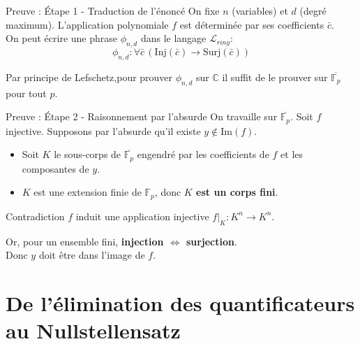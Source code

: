 \documentclass{beamer}
\begin{document}
\begin{frame}{Preuve : Étape 1 - Traduction de l'énoncé}
    On fixe $n$ (variables) et $d$ (degré maximum). L'application polynomiale
    $f$ est déterminée par ses coefficients $\bar{c}$. \\
    \pause
    On peut écrire une phrase $\phi_{n,d}$ dans le langage $\mathcal{L}_{ring}$:
    \[ \phi_{n,d} : \forall \bar{c} \, (\text{Inj}(\bar{c}) \to \text{Surj}(\bar{c})) \]
    
    \pause
    Par principe de Lefschetz,pour prouver $\phi_{n,d}$ sur $\mathbb{C}$ il
    suffit de le prouver sur $\overline{\mathbb{F}_p}$ pour tout $p$.

\end{frame}

\begin{frame}{Preuve : Étape 2 - Raisonnement par l'absurde}
    On travaille sur $\overline{\mathbb{F}_p}$. Soit $f$ injective. Supposons par l'absurde qu'il existe $y \notin \text{Im}(f)$.
    
    \pause
    \begin{itemize}
        \item Soit $K$ le sous-corps de $\overline{\mathbb{F}_p}$ engendré par les coefficients de $f$ et les composantes de $y$.
        \pause
        \item $K$ est une extension finie de $\mathbb{F}_p$, donc \textbf{$K$ est un corps fini}.
    \end{itemize}
    
    \pause
    \begin{alertblock}{Contradiction}
        $f$ induit une application injective $f|_K : K^n \to K^n$. \\

        \pause

        Or, pour un ensemble fini, \textbf{injection $\iff$ surjection}. \\

        Donc $y$ doit être dans l'image de $f$.
    \end{alertblock}
\end{frame}

  
  \section{De l'élimination des quantificateurs au Nullstellensatz}

    
\end{document}
